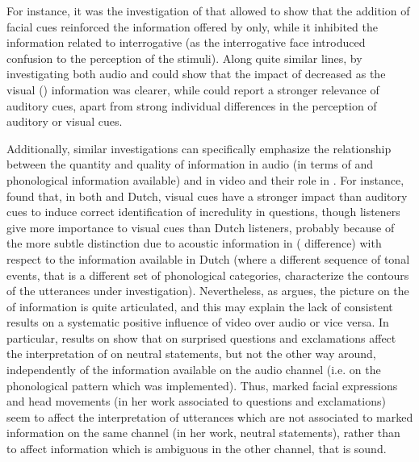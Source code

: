 \documentclass[output=paper]{langsci/langscibook}
\begin{document}
For instance, it was the investigation of  that allowed \citet{House2002} to show that the addition of facial cues reinforced the information offered by   only, while it inhibited the information related to interrogative  (as the interrogative face introduced confusion to the perception of the stimuli). Along quite similar lines, by investigating both audio and  \citet{BorrasComes2011} could show that the impact of  decreased as the visual () information was clearer, while \citet{Srinivasan2003} could report a stronger relevance of auditory cues, apart from strong individual differences in the perception of auditory or visual cues.

Additionally, similar investigations can specifically emphasize the relationship between the quantity and quality of information in audio (in terms of  and phonological information available) and in video and their role in . For instance,  \citet{CrespoSendra2013} found that, in both  and Dutch, visual cues have a stronger impact than auditory cues to induce correct identification of incredulity in questions, though  listeners give more importance to visual cues than Dutch listeners, probably because of the more subtle distinction due to acoustic information in  ( difference) with respect to the information available in Dutch (where a different sequence of tonal events, that is a different set of phonological categories, characterize the contours of the utterances under investigation). Nevertheless, as \citet{GiliFivela2015informazionimultimodali} argues, the picture on the  of information is quite articulated, and this may explain the lack of consistent results on a systematic positive influence of video over audio or vice versa. In particular, results on  show that  on surprised questions and exclamations affect the interpretation of  on neutral statements, but not the other way around, independently of the information available on the audio channel (i.e. on the phonological pattern which was implemented). Thus, marked facial expressions and head movements (in her work associated to questions and exclamations) seem to affect the interpretation of utterances which are not associated to marked information on the same channel (in her work, neutral statements), rather than to affect information which is ambiguous in the other channel, that is sound.\largerpage[-1] 
\end{document}
